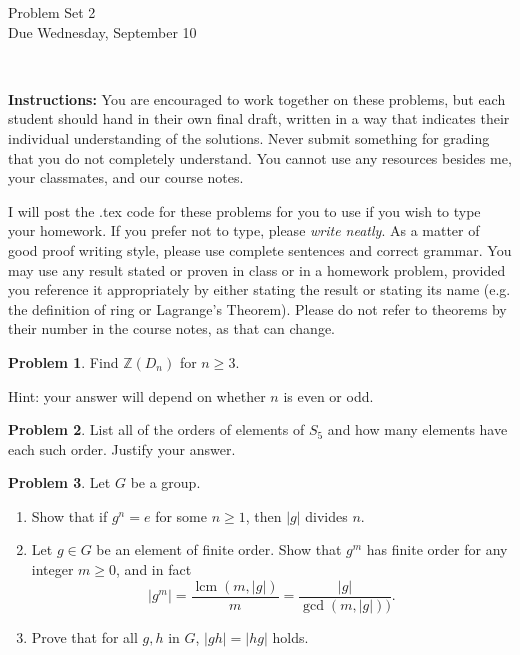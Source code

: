 \documentclass[11pt]{article}
\title{}
\date{\vspace{-0.5in}}
\DeclareMathOperator{\lcm}{lcm}
\newcommand{\Z}{\mathbb{Z}}
\theoremstyle{definition}
\newtheorem{problem}{Problem}
\begin{document}
\thispagestyle{fancy}
\pagestyle{fancy}

\vspace{3em}

\begin{center}
	{\LARGE Problem Set 2 \\}
	Due Wednesday, September 10
\end{center}

\

\noindent
{\bf Instructions:}
You are encouraged to work together on these problems, but each student should hand in their own final draft, written in a way that indicates their individual understanding of the solutions. Never submit something for grading that you do not completely understand. You cannot use any resources besides me, your classmates, and our course notes.


I will post the .tex code for these problems for you to use if you wish to type your homework. If you prefer not to type, please  {\em write neatly}. As a matter of good proof writing style, please use complete sentences and correct grammar. You may use any result stated or proven in class or in a homework problem, provided you reference it appropriately by either stating the result or stating its name (e.g. the definition of ring or Lagrange's Theorem). Please do not refer to theorems by their number in the course notes, as that can change.




\begin{problem}
Find $\Z(D_{n})$ for $n \geqslant 3$.  

\noindent Hint: your answer will depend on whether $n$ is even or odd.
\end{problem}


\begin{problem}
List all of the orders of elements of $S_5$ and how many elements have each such order. Justify your answer.
\end{problem}



\begin{problem} Let $G$ be a group.
 \begin{enumerate}
 \item Show that if $g^n=e$ for some $n \geq 1$, then $|g|$ divides $n$.
\item Let $g \in G$ be an element of finite order. Show that $g^m$ has finite order for any integer $m \geq 0$, and in fact
\[
|g^m| = \frac{\lcm(m,|g|)}{m} = \frac{|g|}{\gcd(m, |g|))}.
\]
\item Prove that for all $g, h$ in  $G$, $|gh| = |hg|$ holds.
\end{enumerate}
\end{problem}
\end{document}
